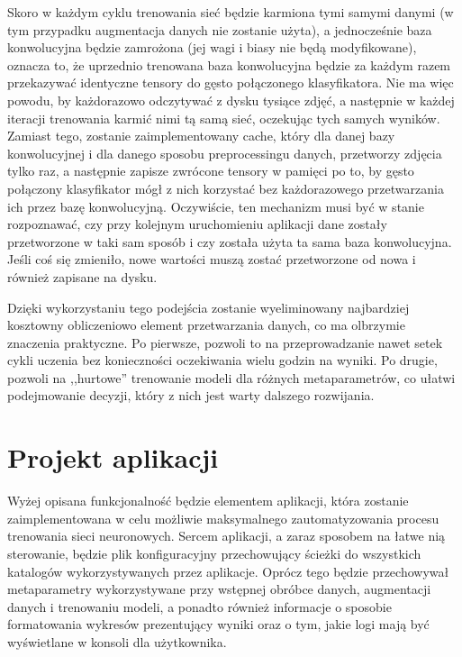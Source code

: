 Skoro w każdym cyklu trenowania sieć będzie karmiona tymi samymi danymi (w tym przypadku augmentacja danych nie zostanie użyta), a jednocześnie baza konwolucyjna będzie zamrożona (jej wagi i biasy nie będą modyfikowane), oznacza to, że uprzednio trenowana baza konwolucyjna będzie za każdym razem przekazywać identyczne tensory do gęsto połączonego klasyfikatora. Nie ma więc powodu, by każdorazowo odczytywać z dysku tysiące zdjęć, a następnie w każdej iteracji trenowania karmić nimi tą samą sieć, oczekując tych samych wyników. Zamiast tego, zostanie zaimplementowany cache, który dla danej bazy konwolucyjnej i dla danego sposobu preprocessingu danych, przetworzy zdjęcia tylko raz, a następnie zapisze zwrócone tensory w pamięci po to, by gęsto połączony klasyfikator mógł z nich korzystać bez każdorazowego przetwarzania ich przez bazę konwolucyjną. Oczywiście, ten mechanizm musi być w stanie rozpoznawać, czy przy kolejnym uruchomieniu aplikacji dane zostały przetworzone w taki sam sposób i czy została użyta ta sama baza konwolucyjna. Jeśli coś się zmieniło, nowe wartości muszą zostać przetworzone od nowa i również zapisane na dysku.

Dzięki wykorzystaniu tego podejścia zostanie wyeliminowany najbardziej kosztowny obliczeniowo element przetwarzania danych, co ma olbrzymie znaczenia praktyczne. Po pierwsze, pozwoli to na przeprowadzanie nawet setek cykli uczenia bez konieczności oczekiwania wielu godzin na wyniki. Po drugie, pozwoli na ,,hurtowe'' trenowanie modeli dla różnych metaparametrów, co ułatwi podejmowanie decyzji, który z nich jest warty dalszego rozwijania.


\section{Projekt aplikacji}
Wyżej opisana funkcjonalność będzie elementem aplikacji, która zostanie zaimplementowana w celu możliwie maksymalnego zautomatyzowania procesu trenowania sieci neuronowych. Sercem aplikacji, a zaraz sposobem na łatwe nią sterowanie, będzie plik konfiguracyjny przechowujący ścieżki do wszystkich katalogów wykorzystywanych przez aplikacje. Oprócz tego będzie przechowywał metaparametry wykorzystywane przy wstępnej obróbce danych, augmentacji danych i trenowaniu modeli, a ponadto również informacje o sposobie formatowania wykresów prezentujący wyniki oraz o tym, jakie logi mają być wyświetlane w konsoli dla użytkownika.

